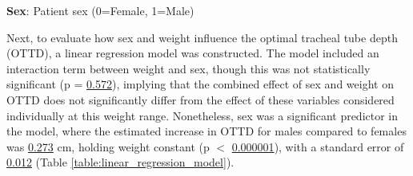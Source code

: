 \documentclass[11pt]{article}
\begin{document}
\begin{table}[h]
\caption{\protect\hyperlink{file-table-0-pkl}{Descriptive statistics of weight stratified by sex.}}
\label{table:descriptive_sex_weight}
\begin{threeparttable}
\renewcommand{\TPTminimum}{\linewidth}
\begin{tablenotes}
\footnotesize
\item \textbf{Sex}: Patient sex (0=Female, 1=Male)
\end{tablenotes}
\end{threeparttable}
\end{table}

Next, to evaluate how sex and weight influence the optimal tracheal tube depth (OTTD), a linear regression model was constructed. The model included an interaction term between weight and sex, though this was not statistically significant (p = \hyperlink{B3d}{0.572}), implying that the combined effect of sex and weight on OTTD does not significantly differ from the effect of these variables considered individually at this weight range. Nonetheless, sex was a significant predictor in the model, where the estimated increase in OTTD for males compared to females was \hyperlink{B2a}{0.273} cm, holding weight constant (p $<$ \hyperlink{B2d}{0.000001}), with a standard error of \hyperlink{B2e}{0.012} (Table \ref{table:linear_regression_model}).
\end{document}
